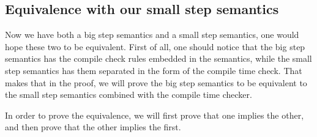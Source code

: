 \subsection{Equivalence with our small step semantics}
Now we have both a big step semantics and a small step semantics, one would hope these two to be equivalent. First of all, one should notice that the big step semantics has the compile check rules embedded in the semantics, while the small step semantics has them separated in the form of the compile time check. That makes that in the proof, we will prove the big step semantics to be equivalent to the small step semantics combined with the compile time checker. 

In order to prove the equivalence, we will first prove that one implies the other, and then prove that the other implies the first. 

